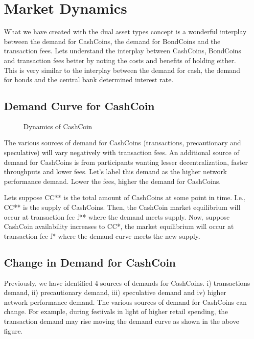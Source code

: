 \section{Market Dynamics}
What we have created with the dual asset types concept is a wonderful interplay between the demand for CashCoins, the demand for BondCoins and the transaction fees. Lets understand the interplay between CashCoins, BondCoins and transaction fees better by noting the costs and benefits of holding either. This is very similar to the interplay between the demand for cash, the demand for bonds and the central bank determined interest rate.

\subsection{Demand Curve for CashCoin}

\begin{figure} [!htbp]
\centering    
{}
\caption{Dynamics of CashCoin}
\end{figure}

The various sources of demand for CashCoins (transactions, precautionary and speculative) will vary negatively with transaction fees. An additional source of demand for CashCoins is from participants wanting lesser decentralization, faster throughputs and lower fees. Let’s label this demand as the higher network performance demand. Lower the fees, higher the demand for CashCoins.

Lets suppose CC** is the total amount of CashCoins at some point in time. I.e., CC** is the supply of CashCoins. Then, the CashCoin market equilibrium will occur at transaction fee f** where the demand meets supply. Now, suppose CashCoin availability increases to CC*, the market equilibrium will occur at transaction fee f* where the demand curve meets the new supply.

\subsection{Change in Demand for CashCoin}

Previously, we have identified 4 sources of demands for CashCoins. i) transactions demand, ii) precautionary demand, iii) speculative demand and iv) higher network performance demand. The various sources of demand for CashCoins can change. For example, during festivals in light of higher retail spending, the transaction demand may rise moving the demand curve as shown in the above figure.

